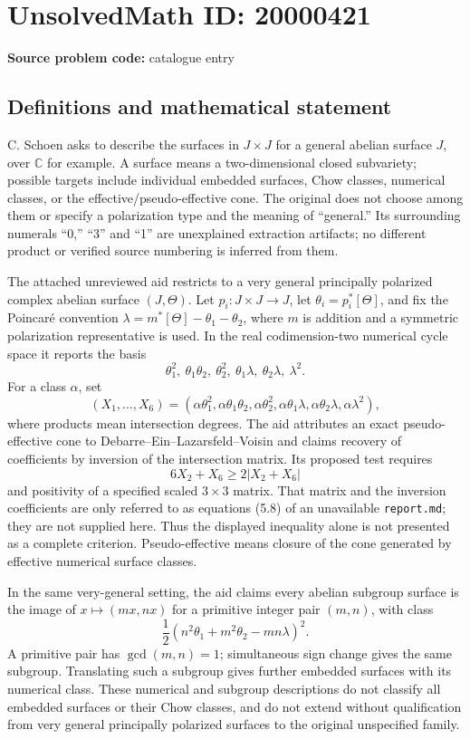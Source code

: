 \documentclass[11pt]{article}
\newcommand{\C}{\mathbb{C}}
\begin{document}
\section*{UnsolvedMath ID: 20000421}
\textbf{Source problem code:} catalogue entry
\subsection{Definitions and mathematical statement}
C. Schoen asks to describe the surfaces in $J\times J$ for a general abelian surface $J$, over $\C$ for example. A surface means a two-dimensional closed subvariety; possible targets include individual embedded surfaces, Chow classes, numerical classes, or the effective/pseudo-effective cone. The original does not choose among them or specify a polarization type and the meaning of ``general.'' Its surrounding numerals ``0,'' ``3'' and ``1'' are unexplained extraction artifacts; no different product or verified source numbering is inferred from them.

The attached unreviewed aid restricts to a very general principally polarized complex abelian surface $(J,\Theta)$. Let $p_i:J\times J\to J$, let $\theta_i=p_i^*[\Theta]$, and fix the Poincar\'e convention $\lambda=m^*[\Theta]-\theta_1-\theta_2$, where $m$ is addition and a symmetric polarization representative is used. In the real codimension-two numerical cycle space it reports the basis
\[
\theta_1^2,\ \theta_1\theta_2,\ \theta_2^2,\
\theta_1\lambda,\ \theta_2\lambda,\ \lambda^2.
\]
For a class $\alpha$, set
\[
(X_1,\ldots,X_6)=
(\alpha\theta_1^2,\alpha\theta_1\theta_2,\alpha\theta_2^2,
 \alpha\theta_1\lambda,\alpha\theta_2\lambda,\alpha\lambda^2),
\]
where products mean intersection degrees. The aid attributes an exact pseudo-effective cone to Debarre--Ein--Lazarsfeld--Voisin and claims recovery of coefficients by inversion of the intersection matrix. Its proposed test requires
\[
6X_2+X_6\ge2|X_2+X_6|
\]
and positivity of a specified scaled $3\times3$ matrix. That matrix and the inversion coefficients are only referred to as equations (5.8) of an unavailable \texttt{report.md}; they are not supplied here. Thus the displayed inequality alone is not presented as a complete criterion. Pseudo-effective means closure of the cone generated by effective numerical surface classes.

In the same very-general setting, the aid claims every abelian subgroup surface is the image of $x\mapsto(mx,nx)$ for a primitive integer pair $(m,n)$, with class
\[
\frac12(n^2\theta_1+m^2\theta_2-mn\lambda)^2.
\]
A primitive pair has $\gcd(m,n)=1$; simultaneous sign change gives the same subgroup. Translating such a subgroup gives further embedded surfaces with its numerical class. These numerical and subgroup descriptions do not classify all embedded surfaces or their Chow classes, and do not extend without qualification from very general principally polarized surfaces to the original unspecified family.
\end{document}
